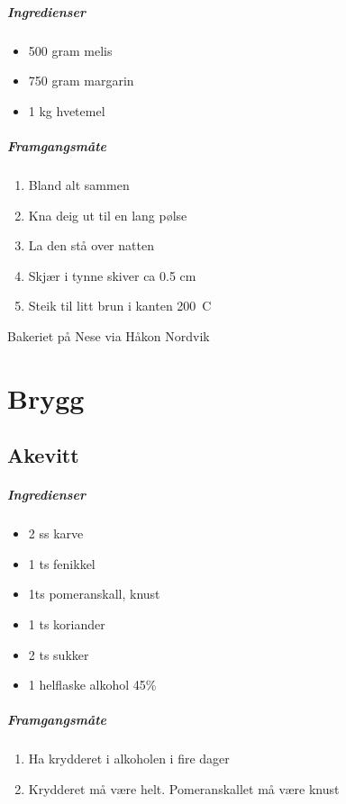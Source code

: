 \documentclass[12pt,a4paper]{book}
\begin{document}
\paragraph{Ingredienser}
\begin{itemize}[noitemsep]
	\item 500 gram melis
	\item 750 gram margarin
	\item 1 kg hvetemel
\end{itemize}

\paragraph{Framgangsmåte}
\begin{enumerate}[noitemsep]
	\item Bland alt sammen
	\item Kna deig ut til en lang pølse
	\item La den stå over natten
	\item Skjær i tynne skiver ca 0.5 cm
	\item Steik til litt brun i kanten 200\degree~C
\end{enumerate}

Bakeriet på Nese via Håkon Nordvik
\clearpage{}
 
\chapter{Brygg}
\clearpage{}\section{﻿Akevitt}
\label{akevitt}


\paragraph{Ingredienser}
\begin{itemize}[noitemsep]
	\item 2 ss karve
	\item 1 ts fenikkel
	\item 1ts pomeranskall, knust
	\item 1 ts koriander
	\item 2 ts sukker
	\item 1 helflaske alkohol 45\%
\end{itemize}

\paragraph{Framgangsmåte}
\begin{enumerate}[noitemsep]
	\item Ha krydderet i alkoholen i fire dager
	\item Krydderet må være helt. Pomeranskallet må være knust
\end{enumerate}
\end{document}
